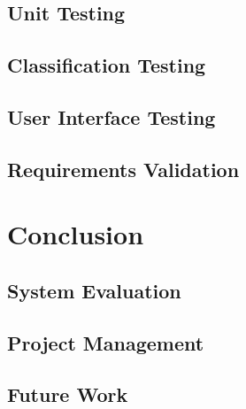 \documentclass[11pt,a4paper]{report}
\begin{document}
    \section{Unit Testing}
    \section{Classification Testing}
    \section{User Interface Testing}
    \section{Requirements Validation}

\chapter{Conclusion}
    \section{System Evaluation}
    \section{Project Management}
    \section{Future Work}

\pagebreak
\end{document}

